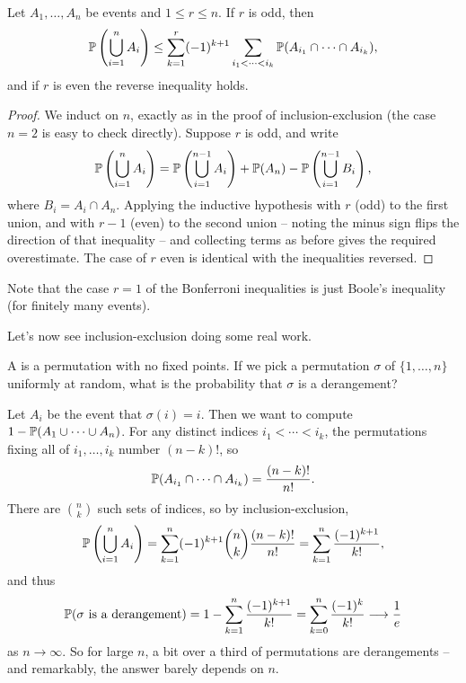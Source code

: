 \documentclass[a4paper]{scrartcl}
\begin{document}
\begin{theorem}
	Let $A_1, \dots, A_n$ be events and $1 \leq r \leq n$. If $r$ is odd, then
	$$
	\mathbb{P}\left(\bigcup_{i = 1}^n A_i\right) \leq \sum_{k = 1}^{r} (-1)^{k + 1} \sum_{i_1 < \cdots < i_k} \mathbb{P}(A_{i_1} \cap \cdots \cap A_{i_k}),
	$$
	and if $r$ is even the reverse inequality holds.
\end{theorem}
\begin{proof}
	We induct on $n$, exactly as in the proof of inclusion-exclusion (the case $n = 2$ is easy to check directly). Suppose $r$ is odd, and write
	$$
	\mathbb{P}\left(\bigcup_{i = 1}^{n} A_i\right) = \mathbb{P}\left(\bigcup_{i = 1}^{n-1} A_i\right) + \mathbb{P}(A_n) - \mathbb{P}\left(\bigcup_{i = 1}^{n - 1} B_i\right),
	$$
	where $B_i = A_i \cap A_n$. Applying the inductive hypothesis with $r$ (odd) to the first union, and with $r - 1$ (even) to the second union -- noting the minus sign flips the direction of that inequality -- and collecting terms as before gives the required overestimate. The case of $r$ even is identical with the inequalities reversed.
\end{proof}

Note that the case $r = 1$ of the Bonferroni inequalities is just Boole's inequality (for finitely many events).

Let's now see inclusion-exclusion doing some real work.

\begin{example}[Derangements]
	A  is a permutation with no fixed points. If we pick a permutation $\sigma$ of $\{1, \dots, n\}$ uniformly at random, what is the probability that $\sigma$ is a derangement?

	Let $A_i$ be the event that $\sigma(i) = i$. Then we want to compute $1 - \mathbb{P}(A_1 \cup \cdots \cup A_n)$. For any distinct indices $i_1 < \cdots < i_k$, the permutations fixing all of $i_1, \dots, i_k$ number $(n - k)!$, so
	$$
	\mathbb{P}(A_{i_1} \cap \cdots \cap A_{i_k}) = \frac{(n-k)!}{n!}.
	$$
	There are $\binom{n}{k}$ such sets of indices, so by inclusion-exclusion,
	$$
	\mathbb{P}\left(\bigcup_{i = 1}^{n} A_i\right) = \sum_{k = 1}^{n} (-1)^{k+1} \binom{n}{k} \frac{(n - k)!}{n!} = \sum_{k = 1}^{n} \frac{(-1)^{k + 1}}{k!},
	$$
	and thus
	$$
	\mathbb{P}(\sigma \text{ is a derangement}) = 1 - \sum_{k = 1}^{n} \frac{(-1)^{k+1}}{k!} = \sum_{k = 0}^{n} \frac{(-1)^k}{k!} \longrightarrow \frac{1}{e}
	$$
	as $n \rightarrow \infty$. So for large $n$, a bit over a third of permutations are derangements -- and remarkably, the answer barely depends on $n$.
\end{example}
\end{document}
